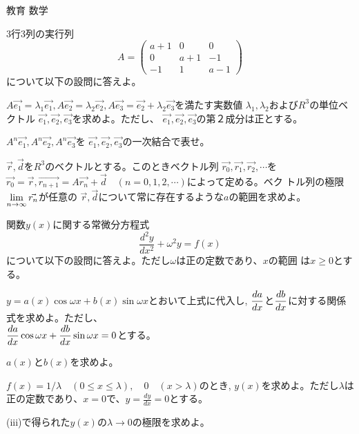 \documentclass[fleqn]{jbook}
\begin{document}
\begin{question}{教育 数学}{}
\begin{subquestions}

\SubQuestion
3行3列の実行列
\[ A =\left( \begin{array}{ccc}
a+1 & 0 & 0 \\
0 & a+1 & -1 \\
-1 & 1 & a-1 
\end{array}\right)
\]
について以下の設問に答えよ。

\begin{subsubquestions}
\SubSubQuestion
$A\vec{e_1}=\lambda_1 \vec{e_1}, A\vec{e_2}=\lambda_2 \vec{e_2},
A\vec{e_3}=\vec{e_2}+\lambda_2 \vec{e_3}$を満たす実数値
$\lambda_1,\lambda_2$および$R^3$の単位ベクトル
$\vec{e_1},\vec{e_2},\vec{e_3}$を求めよ。ただし、
$\vec{e_1},\vec{e_2},\vec{e_3}$の第２成分は正とする。

\SubSubQuestion
$A^n\vec{e_1}, A^n\vec{e_2}, A^n\vec{e_3}$を
$\vec{e_1},\vec{e_2},\vec{e_3}$の一次結合で表せ。

\SubSubQuestion
$\vec{r},\vec{d}$を$R^3$のベクトルとする。このときベクトル列
$\vec{r_0},\vec{r_1},\vec{r_2},\cdots $を$\vec{r_0}=\vec{r},
\vec{r_{n+1}}=A\vec{r_n}+\vec{d} \quad (n=0,1,2,\cdots)$によって定める。ベク
トル列の極限$\displaystyle{\lim_{n\rightarrow\infty} \vec{r_n}}$が任意の
$\vec{r},\vec{d}$について常に存在するような$a$の範囲を求めよ。

\end{subsubquestions}

\SubQuestion
関数$y(x)$に関する常微分方程式
\[ \frac{d^2 y}{dx^2}+\omega^2 y =f(x) \]
について以下の設問に答えよ。ただし$\omega$は正の定数であり、$x$の範囲
は$x\geq0$とする。

\begin{subsubquestions}
\SubQuestion
$y=a(x)\cos\omega x+b(x)\sin\omega x$とおいて上式に代入し, $\displaystyle{\frac{da}{dx}}$と$\displaystyle{\frac{db}{dx}}$に対する関係式を求めよ。ただし、\\
$\displaystyle{\frac{da}{dx}\cos\omega x+\frac{db}{dx}\sin\omega x =0}$とする。

\SubQuestion
$a(x)$と$b(x)$を求めよ。

\SubQuestion
$f(x)=1/\lambda \quad (0 \leq x \leq \lambda),\quad 0 \quad (x >
\lambda)$のとき, $y(x)$を求めよ。ただし$\lambda$は正の定数であり、$x=0$で、$y=\frac{dy}{dx}=0$とする。

\SubQuestion

(iii)で得られた$y(x)$の$\lambda\rightarrow 0$の極限を求めよ。

\end{subsubquestions}


\end{subquestions}
\end{question}
\end{document}
